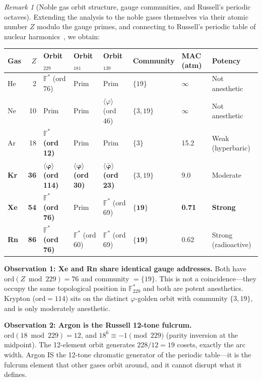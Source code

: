 \documentclass[12pt,oneside]{article}
\theoremstyle{principia}
\theoremstyle{definition}
\theoremstyle{remark}
\newtheorem{remark}[theorem]{Remark}
\providecommand{\vp}{\varphi}
\providecommand{\vpbar}{\bar{\varphi}}
\begin{document}
\begin{remark}[Noble gas orbit structure, gauge communities, and Russell's periodic octaves]
\label{rem:noble_gas_orbits}
Extending the analysis to the noble gases themselves via their atomic number $Z$ modulo the gauge primes, and connecting to Russell's periodic table of nuclear harmonics~\cite{Russell1926}, we obtain:

\begin{center}
{\small
\begin{tabular}{@{}lrllllll@{}}
\toprule
\textbf{Gas} & $Z$ & \textbf{Orbit$_{229}$} & \textbf{Orbit$_{181}$} & \textbf{Orbit$_{139}$} & \textbf{Community} & \textbf{MAC (atm)} & \textbf{Potency} \\
\midrule
He &  2 & $\mathbb{F}^*$ (ord 76)  & Prim & Prim & $\{19\}$ & $\infty$ & Not anesthetic \\
Ne & 10 & Prim                      & Prim & $\langle\vp\rangle$ (ord 46) & $\{3,19\}$ & $\infty$ & Not anesthetic \\
Ar & 18 & $\mathbb{F}^*$ \textbf{(ord 12)} & Prim & Prim & $\{3\}$ & 15.2 & Weak (hyperbaric) \\
\textbf{Kr} & \textbf{36} & $\boldsymbol{\langle\vp\rangle}$ \textbf{(ord 114)} & $\boldsymbol{\langle\vp\rangle}$ \textbf{(ord 30)} & $\boldsymbol{\langle\vpbar\rangle}$ \textbf{(ord 23)} & $\{3,19\}$ & 9.0 & Moderate \\
\textbf{Xe} & \textbf{54} & $\mathbb{F}^*$ \textbf{(ord 76)}  & Prim & $\mathbb{F}^*$ (ord 69) & $\boldsymbol{\{19\}}$ & \textbf{0.71} & \textbf{Strong} \\
\textbf{Rn} & \textbf{86} & $\mathbb{F}^*$ \textbf{(ord 76)}  & $\mathbb{F}^*$ (ord 60) & $\mathbb{F}^*$ (ord 69) & $\boldsymbol{\{19\}}$ & 0.62 & Strong (radioactive) \\
\bottomrule
\end{tabular}
}
\end{center}

\textbf{Observation 1: Xe and Rn share identical gauge addresses.} Both have $\mathrm{ord}(Z \bmod 229) = 76$ and community $= \{19\}$. This is not a coincidence---they occupy the same topological position in $\mathbb{F}_{229}^*$ and both are potent anesthetics. Krypton ($\mathrm{ord} = 114$) sits on the distinct $\varphi$-golden orbit with community $\{3,19\}$, and is only moderately anesthetic.

\textbf{Observation 2: Argon is the Russell 12-tone fulcrum.} $\mathrm{ord}(18 \bmod 229) = 12$, and $18^6 \equiv -1 \pmod{229}$ (parity inversion at the midpoint). The 12-element orbit generates $228/12 = 19$ cosets, exactly the arc width. Argon IS the 12-tone chromatic generator of the periodic table---it is the fulcrum element that other gases orbit around, and it cannot disrupt what it defines.


\end{remark}
\end{document}

